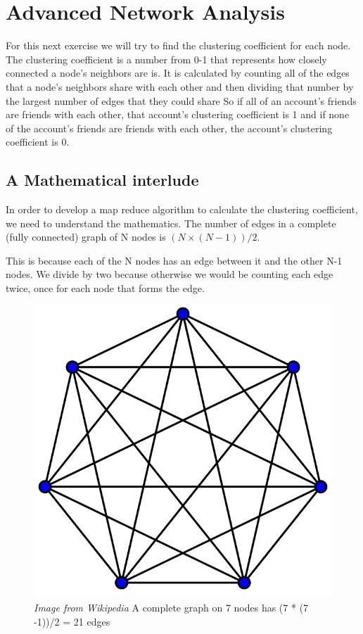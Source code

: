 \documentclass[letterpaper,10pt,openany,oneside]{sphinxmanual}
\begin{document}
\section{Advanced Network Analysis}
\label{1-AdvancedNetwork/AdvancedNetwork::doc}\label{1-AdvancedNetwork/AdvancedNetwork:advanced-network-analysis}
For this next exercise we will try to find the clustering
coefficient for each node. The clustering coefficient is a number
from 0-1 that represents how closely connected a node's
neighbors are is. It is calculated by counting all of the edges
that a node's neighbors share with each other and then dividing
that number by the largest number of edges that they could share
So if all of an account's friends are friends with each other,
that account's clustering coefficient is 1 and if none of the
account's friends are friends with each other, the account's
clustering coefficient is 0.


\subsection{A Mathematical interlude}
\label{1-AdvancedNetwork/AdvancedNetwork:a-mathematical-interlude}
In order to develop a map reduce algorithm to calculate the
clustering coefficient, we need to understand the mathematics.
The number of edges in a complete (fully connected) graph of
N nodes is $(N \times (N-1))/2$.

This is because each of the N nodes
has an edge between it and the other N-1 nodes. We divide by
two because otherwise we would be counting each edge twice,
once for each node that forms the edge.
\begin{figure}[htbp]
\centering
\capstart

\includegraphics{complete-graph.png}
\caption{\emph{Image from Wikipedia}
A complete graph on 7 nodes has (7 * (7 -1))/2 = 21
edges}\end{figure}
\end{document}
